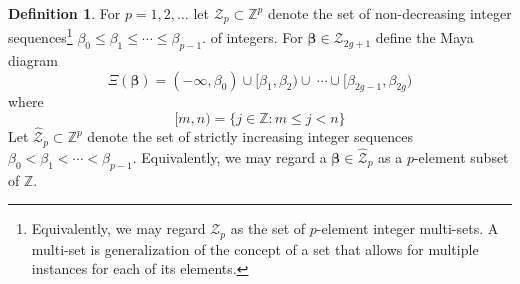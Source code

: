 \documentclass{amsart}
\newtheorem{proposition}{Proposition}
\theoremstyle{definition}
\newtheorem{definition}{Definition}
\newcommand{\Z}{\mathbb{Z}}
\newcommand{\bbeta}{{\boldsymbol{\beta}}}
\newcommand{\cZ}{\mathcal{Z}}
\newcommand{\hcZ}{\hat{\cZ}}
\begin{document}
% 
\begin{definition}
  For $p=1,2,\ldots$ let $\cZ_p\subset\Z^p$ denote the set of
  non-decreasing integer sequences\footnote{Equivalently, we may
    regard $\cZ_p$ as the set of $p$-element integer multi-sets. A
    multi-set is generalization of the concept of a set that allows
    for multiple instances for each of its elements. }
  $\beta_0\leq \beta_1\leq\cdots \leq \beta_{p-1}$.  of integers.  For
  $\bbeta\in \cZ_{2g+1}$ define the Maya diagram
  \begin{equation}
    \label{eq:MBi}
    \Xi(\bbeta)= (-\infty,\beta_0) \cup [\beta_1,\beta_2) \cup
    \ \cdots \cup [\beta_{2g-1},\beta_{2g})
  \end{equation}
  where
  \[ [m,n) = \{ j\in \Z \colon m\leq j < n\}\] Let
  $\hcZ_p\subset \Z^p$ denote the set of strictly increasing integer
  sequences $\beta_0<\beta_1<\cdots < \beta_{p-1}$.  Equivalently, we
  may regard a $\bbeta\in \hcZ_p$ as a $p$-element subset of $\Z$.
\end{definition}
\end{document}

